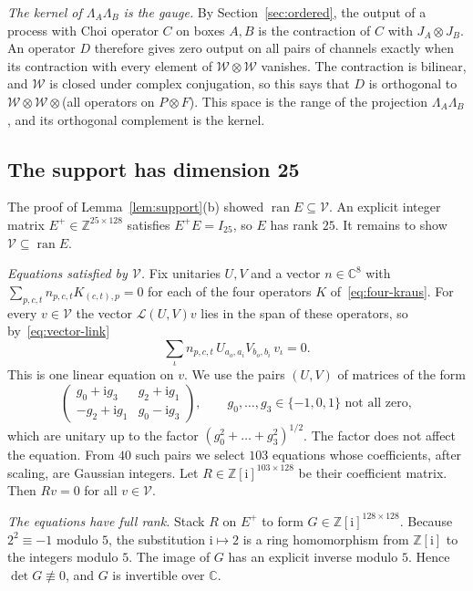\documentclass[11pt,letterpaper]{article}
\theoremstyle{definition}\newtheorem{definition}[theorem]{Definition}
\newcommand{\C}{\mathbb C}
\begin{document}
\emph{The kernel of $\Lambda_A\Lambda_B$ is the gauge.} By
Section~\ref{sec:ordered}, the output of
a process with Choi operator $C$ on boxes $A,B$ is the contraction of
$C$ with $J_A\otimes J_B$. An operator $D$
therefore gives zero output on all pairs of channels exactly when its
contraction with every element of $\mathcal W\otimes\mathcal W$
vanishes. The contraction is bilinear, and $\mathcal W$ is closed under
complex conjugation, so this says that $D$ is orthogonal to
$\mathcal W\otimes\mathcal W\otimes{}$(all operators on $P\otimes F$).
This space is the range of the projection $\Lambda_A\Lambda_B$, and its
orthogonal complement is the kernel.

\subsection{The support has dimension 25}\label{sec:support-proof}

The proof of Lemma~\ref{lem:support}(b) showed
$\operatorname{ran}E\subseteq\mathcal V$. An explicit integer matrix
$E^+\in\mathbb Z^{25\times128}$ satisfies $E^+E=I_{25}$, so $E$ has
rank $25$. It remains to show
$\mathcal V\subseteq\operatorname{ran}E$.

\emph{Equations satisfied by $\mathcal V$.} Fix unitaries $U,V$ and a
vector $n\in\C^8$ with $\sum_{p,c,t}n_{p,c,t}K_{(c,t),p}=0$ for each of
the four operators $K$ of~\eqref{eq:four-kraus}. For every
$v\in\mathcal V$ the vector $\mathcal L(U,V)v$ lies in the span of
these operators, so by~\eqref{eq:vector-link}
\[
 \sum_{\iota}n_{p,c,t}\,U_{a_o,a_i}V_{b_o,b_i}\,v_\iota=0 .
\]
This is one linear equation on $v$. We use the pairs $(U,V)$ of
matrices of the form
\[
 \begin{pmatrix}g_0+\mathrm ig_3&g_2+\mathrm ig_1\\-g_2+\mathrm ig_1&g_0-\mathrm ig_3\end{pmatrix},
 \qquad g_0,\dots,g_3\in\{-1,0,1\}\text{ not all zero},
\]
which are unitary up to the factor $(g_0^2+\dots+g_3^2)^{1/2}$. The
factor does not affect the equation. From $40$ such pairs we select
$103$ equations whose coefficients, after scaling, are Gaussian
integers. Let $R\in\mathbb Z[\mathrm i]^{103\times128}$ be their
coefficient matrix. Then $Rv=0$ for all $v\in\mathcal V$.

\emph{The equations have full rank.} Stack $R$ on $E^+$ to form
$G\in\mathbb Z[\mathrm i]^{128\times128}$. Because $2^2\equiv-1$
modulo $5$, the substitution $\mathrm i\mapsto2$ is a ring homomorphism
from $\mathbb Z[\mathrm i]$ to the integers modulo $5$. The image of
$G$ has an explicit inverse modulo $5$. Hence $\det G\not\equiv0$, and
$G$ is invertible over $\C$.
\end{document}

